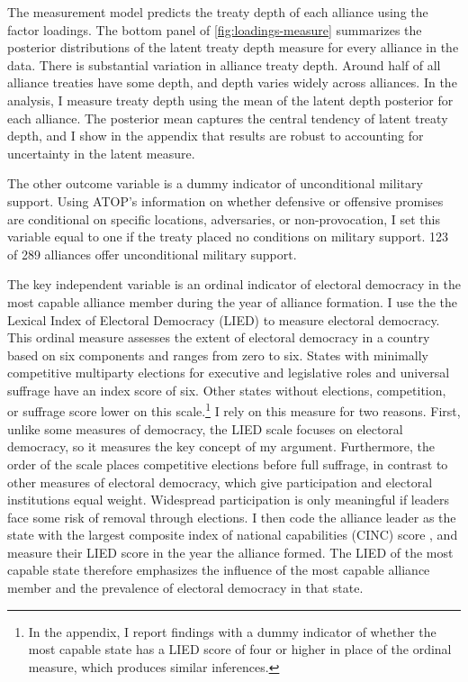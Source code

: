 \documentclass[12pt]{article}
\begin{document}
The measurement model predicts the treaty depth of each alliance using the factor loadings. 
The bottom panel of \autoref{fig:loadings-measure} summarizes the posterior distributions of the latent treaty depth measure for every alliance in the data. 
There is substantial variation in alliance treaty depth. 
Around half of all alliance treaties have some depth, and depth varies widely across alliances.
In the analysis, I measure treaty depth using the mean of the latent depth posterior for each alliance. 
The posterior mean captures the central tendency of latent treaty depth, and I show in the appendix that results are robust to accounting for uncertainty in the latent measure. 


The other outcome variable is a dummy indicator of unconditional military support. 
Using ATOP's information on whether defensive or offensive promises are conditional on specific locations, adversaries, or non-provocation, I set this variable equal to one if the treaty placed no conditions on military support.
123 of 289 alliances offer unconditional military support. 


The key independent variable is an ordinal indicator of electoral democracy in the most capable alliance member during the year of alliance formation. 
I use the the Lexical Index of Electoral Democracy (LIED) \citep{Skaaningetal2015} to measure electoral democracy.
This ordinal measure assesses the extent of electoral democracy in a country based on six components and ranges from zero to six.  
States with minimally competitive multiparty elections for executive and legislative roles and universal suffrage have an index score of six.
Other states without elections, competition, or suffrage score lower on this scale.\footnote{In the appendix, I report findings with a dummy indicator of whether the most capable state has a LIED score of four or higher in place of the ordinal measure, which produces similar inferences.}
I rely on this measure for two reasons. 
First, unlike some measures of democracy, the LIED scale focuses on electoral democracy, so it measures the key concept of my argument.
Furthermore, the order of the scale places competitive elections before full suffrage, in contrast to other measures of electoral democracy, which give participation and electoral institutions equal weight. 
Widespread participation is only meaningful if leaders face some risk of removal through elections. 
I then code the alliance leader as the state with the largest composite index of national capabilities (CINC) score \citep{SingerCINC1988}, and measure their LIED score in the year the alliance formed.
The LIED of the most capable state therefore emphasizes the influence of the most capable alliance member and the prevalence of electoral democracy in that state.
\end{document}
